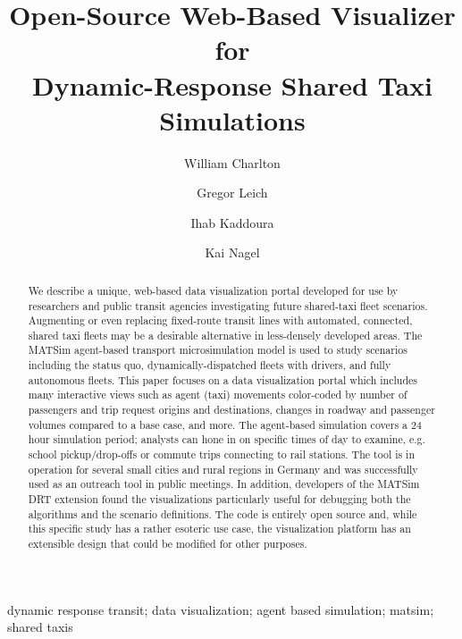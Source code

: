 \documentclass[3p,times,procedia]{elsarticle}
\begin{document}
\begin{frontmatter}

%

\title{Open-Source Web-Based Visualizer for \\ Dynamic-Response Shared Taxi Simulations}

\author[a]{William Charlton}
\author[a]{Gregor Leich}
\author[a]{Ihab Kaddoura}
\author[a]{Kai Nagel}

\address[a]{Technische Universität Berlin, Chair of Transport Systems Planning and Transport Telematics, Straße des 17. Juni 135, 10623 Berlin, Germany}

\begin{abstract}

We describe a unique, web-based data visualization portal developed for use by researchers and public transit agencies investigating future shared-taxi fleet scenarios. Augmenting or even replacing fixed-route transit lines with automated, connected, shared taxi fleets may be a desirable alternative in less-densely developed areas. The MATSim agent-based transport microsimulation model is used to study scenarios including the status quo, dynamically-dispatched fleets with drivers, and fully autonomous fleets. This paper focuses on a data visualization portal which includes many interactive views such as agent (taxi) movements color-coded by number of passengers and trip request origins and destinations, changes in roadway and passenger volumes compared to a base case, and more. The agent-based simulation covers a 24 hour simulation period; analysts can hone in on specific times of day to examine, e.g. school pickup/drop-offs or commute trips connecting to rail stations. The tool is in operation for several small cities and rural regions in Germany and was successfully used as an outreach tool in public meetings. In addition, developers of the MATSim DRT extension found the visualizations particularly useful for debugging both the algorithms and the scenario definitions. The code is entirely open source and, while this specific study has a rather esoteric use case, the visualization platform has an extensible design that could be modified for other purposes.

\end{abstract}

\begin{keyword}
dynamic response transit; data visualization; agent based simulation; matsim; shared taxis
\end{keyword}


\end{frontmatter}
\end{document}
